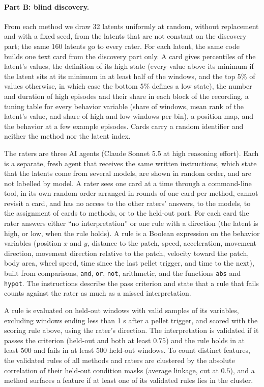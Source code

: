 \paragraph{Part B: blind discovery.}
From each method we draw 32 latents uniformly at random, without replacement and with a fixed seed, from the latents that are not constant on the discovery part; the same 160 latents go to every rater. For each latent, the same code builds one text card from the discovery part only. A card gives percentiles of the latent's values, the definition of its high state (every value above its minimum if the latent sits at its minimum in at least half of the windows, and the top 5\% of values otherwise, in which case the bottom 5\% defines a low state), the number and duration of high episodes and their share in each block of the recording, a tuning table for every behavior variable (share of windows, mean rank of the latent's value, and share of high and low windows per bin), a position map, and the behavior at a few example episodes. Cards carry a random identifier and neither the method nor the latent index.

The raters are three AI agents (Claude Sonnet 5.5 at high reasoning effort). Each is a separate, fresh agent that receives the same written instructions, which state that the latents come from several models, are shown in random order, and are not labelled by model. A rater sees one card at a time through a command-line tool, in its own random order arranged in rounds of one card per method, cannot revisit a card, and has no access to the other raters' answers, to the models, to the assignment of cards to methods, or to the held-out part. For each card the rater answers either ``no interpretation'' or one rule with a direction (the latent is high, or low, when the rule holds). A rule is a Boolean expression on the behavior variables (position $x$ and $y$, distance to the patch, speed, acceleration, movement direction, movement direction relative to the patch, velocity toward the patch, body area, wheel speed, time since the last pellet trigger, and time to the next), built from comparisons, \texttt{and}, \texttt{or}, \texttt{not}, arithmetic, and the functions \texttt{abs} and \texttt{hypot}. The instructions describe the pass criterion and state that a rule that fails counts against the rater as much as a missed interpretation.

A rule is evaluated on held-out windows with valid samples of its variables, excluding windows ending less than 1 s after a pellet trigger, and scored with the scoring rule above, using the rater's direction. The interpretation is validated if it passes the criterion (held-out  and  both at least $0.75$) and the rule holds in at least 500 and fails in at least 500 held-out windows. To count distinct features, the validated rules of all methods and raters are clustered by the absolute correlation of their held-out condition masks (average linkage, cut at $0.5$), and a method surfaces a feature if at least one of its validated rules lies in the cluster.

